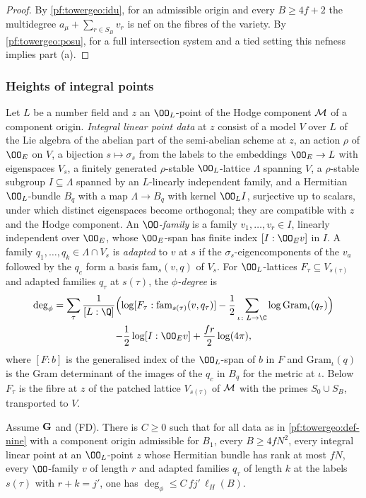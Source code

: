 \begin{proof}
By \cref{pf:towergeo:idu}, for an admissible origin and every $B\ge4f+2$ the multidegree
$a_\mu+\sum_{r\in S_B}v_r$ is nef on the fibres of the variety. By \cref{pf:towergeo:posu}, for a full intersection
system and a tied setting this nefness implies part (a).
\end{proof}

\subsubsection*{Heights of integral points}
Let $L$ be a number field and $z$ an $\OO_L$-point of the Hodge component $\mathcal M$ of a component origin.
\emph{Integral linear point data} at $z$ consist of a model $V$ over $L$ of the Lie algebra of the abelian part of the
semi-abelian scheme at $z$, an action $\rho$ of $\OO_E$ on $V$, a bijection $s\mapsto\sigma_s$ from the labels to the
embeddings $\OO_E\to L$ with eigenspaces $V_s$, a finitely generated $\rho$-stable $\OO_L$-lattice $\Lambda$ spanning
$V$, a $\rho$-stable subgroup $I\subseteq\Lambda$ spanned by an $L$-linearly independent family, and a Hermitian
$\OO_L$-bundle $B_q$ with a map $\Lambda\to B_q$ with kernel $\OO_LI$, surjective up to scalars, under which distinct
eigenspaces become orthogonal; they are compatible with $z$ and the Hodge component. An \emph{$\OO$-family} is a
family $v_1,\dots,v_r\in I$, linearly independent over $\OO_E$, whose $\OO_E$-span has finite index $[I:\OO_Ev]$ in
$I$. A family $q_1,\dots,q_k\in\Lambda\cap V_s$ is \emph{adapted} to $v$ at $s$ if the $\sigma_s$-eigencomponents of
the $v_a$ followed by the $q_c$ form a basis $\mathrm{fam}_s(v,q)$ of $V_s$. For $\OO_L$-lattices
$F_\tau\subseteq V_{s(\tau)}$ and adapted families $q_\tau$ at $s(\tau)$, the \emph{$\phi$-degree} is
\begin{multline*}
\deg_\phi=\sum_\tau\frac1{[L:\Q]}\Bigl(\log[F_\tau:\mathrm{fam}_{s(\tau)}(v,q_\tau)]
-\frac12\sum_{\iota\colon L\to\C}\log\mathrm{Gram}_\iota(q_\tau)\Bigr)\\
-\frac12\log[I:\OO_Ev]+\frac{fr}2\log(4\pi),
\end{multline*}
where $[F:b]$ is the generalised index of the $\OO_L$-span of $b$ in $F$ and $\mathrm{Gram}_\iota(q)$ is the Gram
determinant of the images of the $q_c$ in $B_q$ for the metric at $\iota$. Below $F_\tau$ is the fibre at $z$ of the
patched lattice $V_{s(\tau)}$ of $\mathcal M$ with the primes $S_0\cup S_B$, transported to $V$.

\begin{proposition}\label{pf:towergeo:phideg}
Assume $\mathbf G$ and \textup{(FD)}. There is $C\ge0$ such that for all data as in \cref{pf:towergeo:def-nine} with
a component origin admissible for $B_1$, every $B\ge4fN^2$, every integral linear point at an $\OO_L$-point $z$ whose
Hermitian bundle has rank at most $fN$, every $\OO$-family $v$ of length $r$ and adapted families $q_\tau$ of length
$k$ at the labels $s(\tau)$ with $r+k=j'$, one has $\deg_\phi\le C\,fj'\,\ell_H(B)$.
\end{proposition}


